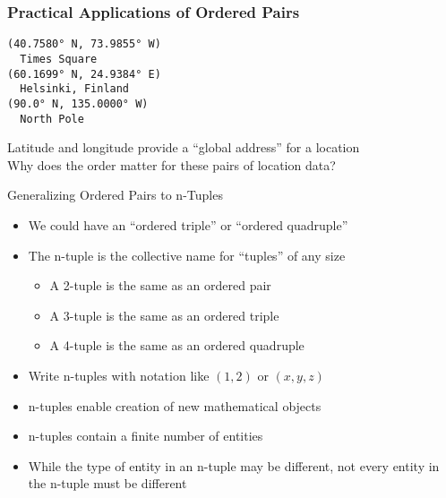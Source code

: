 \documentclass[14pt,aspectratio=169]{beamer}
\begin{document}
%
\begin{frame}[fragile]
  \frametitle{Practical Applications of Ordered Pairs}
  \begin{minipage}{6in}
    \vspace*{.25in}
    \begin{verbatim}
(40.7580° N, 73.9855° W)
  Times Square
(60.1699° N, 24.9384° E)
  Helsinki, Finland
(90.0° N, 135.0000° W)
  North Pole
    \end{verbatim}
  \end{minipage}
  \vspace*{.05in}
  \begin{center}
    \normalsize \noindent Latitude and longitude provide a ``global address''
    for a location\\
    \normalsize \noindent Why does the order matter for these pairs of location
    data?\\
  \end{center}
\end{frame}

%
\begin{frame}{Generalizing Ordered Pairs to n-Tuples}
  \begin{itemize}
    \item We could have an ``ordered triple'' or ``ordered quadruple''
      \vspace*{-.15in}
    \item The n-tuple is the collective name for ``tuples'' of any size
      \begin{itemize}
        \item A 2-tuple is the same as an ordered pair
        \item A 3-tuple is the same as an ordered triple
        \item A 4-tuple is the same as an ordered quadruple
      \end{itemize}
      \vspace*{-.2in}
    \item Write n-tuples with notation like $(1,2)$ or $(x,y,z)$
      \vspace*{-.2in}
    \item n-tuples enable creation of new mathematical objects
      \vspace*{-.2in}
    \item n-tuples contain a finite number of entities
      \vspace*{-.2in}
    \item While the type of entity in an n-tuple may be different, not
      every entity in the n-tuple must be different
  \end{itemize}
\end{frame}
\end{document}
